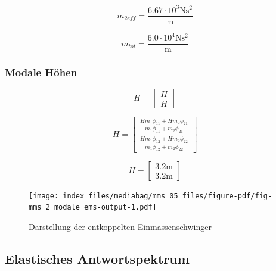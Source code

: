 \documentclass[
  letterpaper,
  DIV=11]{scrreprt}
\begin{document}
\begin{equation}m_{2eff} = \frac{6.67 \cdot 10^{3} \text{N} \text{s}^{2}}{\text{m}}\end{equation}

\begin{equation}m_{tot} = \frac{6.0 \cdot 10^{4} \text{N} \text{s}^{2}}{\text{m}}\end{equation}

\hypertarget{modale-huxf6hen-2}{%
\subsubsection{Modale Höhen}\label{modale-huxf6hen-2}}

\begin{equation}H = \left[\begin{matrix}H\\H\end{matrix}\right]\end{equation}

\begin{equation}H = \left[\begin{matrix}\frac{H m_{1} \phi_{11} + H m_{2} \phi_{21}}{m_{1} \phi_{11} + m_{2} \phi_{21}}\\\frac{H m_{1} \phi_{12} + H m_{2} \phi_{22}}{m_{1} \phi_{12} + m_{2} \phi_{22}}\end{matrix}\right]\end{equation}

\begin{equation}H = \left[\begin{matrix}3.2 \text{m}\\3.2 \text{m}\end{matrix}\right]\end{equation}

\begin{figure}[H]

{\centering \texttt{[image: index\_files/mediabag/mms\_05\_files/figure-pdf/fig-mms\_2\_modale\_ems-output-1.pdf]}

}

\caption{\label{fig-mms_2_modale_ems}Darstellung der entkoppelten
Einmassenschwinger}

\end{figure}

\hypertarget{elastisches-antwortspektrum-2}{%
\subsection{Elastisches
Antwortspektrum}\label{elastisches-antwortspektrum-2}}
\end{document}
